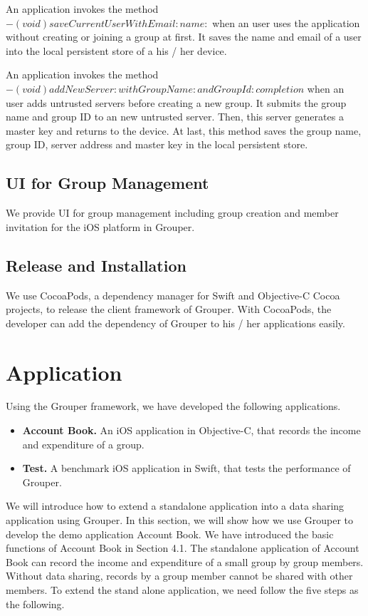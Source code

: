 \documentclass[a4paper,11pt]{report}
\begin{document}
An application invokes the method $- (void)saveCurrentUserWithEmail:name:$ when an user uses the application without creating or joining a group at first.
It saves the name and email of a user into the local persistent store of a his / her device.

An application invokes the method $- (void)addNewServer:withGroupName:andGroupId:completion$ when an user adds untrusted servers before creating a new group. 
It submits the group name and group ID to an new untrusted server.
Then, this server generates a master key and returns to the device.
At last, this method saves the group name, group ID, server address and master key in the local persistent store.


\subsection{UI for Group Management}

We provide UI for group management including group creation and member invitation for the iOS platform in Grouper. 

\subsection{Release and Installation}

We use CocoaPods\cite{cocoapods}, a dependency manager for Swift and Objective-C Cocoa projects, to release the client framework of Grouper.
With CocoaPods, the developer can add the dependency of Grouper to his / her applications easily.

\section{Application} \label{section:application}

Using the Grouper framework, we have developed the following applications. 

\begin{itemize}
	\setlength{\itemsep}{1pt}
	\setlength{\parskip}{0pt}
	\setlength{\parsep}{0pt}
	\item \textbf{Account Book.} An iOS application in Objective-C, that records the income and expenditure of a group.
	\item \textbf{Test.} A benchmark iOS application in Swift, that tests the performance of Grouper.
\end{itemize}

We will introduce how to extend a standalone application into a data sharing application using Grouper.
In this section, we will show how we use Grouper to develop the demo application Account Book.
We have introduced the basic functions of Account Book in Section 4.1.
The standalone application of Account Book can record the income and expenditure of a small group by group members.
Without data sharing, records by a group member cannot be shared with other members.
To extend the stand alone application, we need follow the five steps as the following.
\end{document}
